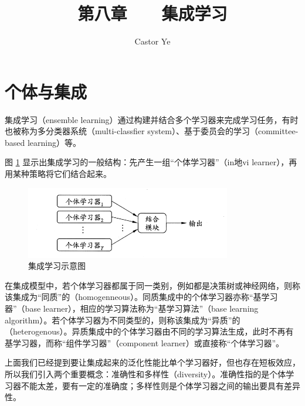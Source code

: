 \documentclass[12pt, a4paper]{article} %
\title{第八章 \ \ \ 集成学习} %
\author{Castor Ye} %
\date{} %
\begin{document}
\maketitle %
\newtheorem{definition}{定义}[section]
\newtheorem{theorem}{定理}[section]
\newtheorem{example}{例}[section]
\newtheorem{solution}{题解}
\newtheorem{algorithm}{算法}
\newtheorem{axiom}{公理}
\newtheorem{property}{性质}
\newtheorem{proposition}{命题}
\newtheorem{lemma}{引理}
\newtheorem{corollary}{推论}[section]
\newtheorem{remark}{注解}
\newtheorem{condition}{条件}
\newtheorem{conclusion}{结论}
\newtheorem{assumption}{假设}
\renewcommand{\figurename}{图} %
\renewcommand{\tablename}{表} %
\section{个体与集成}

集成学习（ensemble learning）通过构建并结合多个学习器来完成学习任务，有时也被称为多分类器系统（multi-classfier system）、基于委员会的学习（committee-based learning）等。

图 \ref{fig:集成学习示意图} 显示出集成学习的一般结构：先产生一组“个体学习器”（in地vi learner），再用某种策略将它们结合起来。

\begin{figure}[H]
    \centering
    \includegraphics[width=0.8\textwidth]{../img/8-1-集成学习示意图.png}
    \caption{集成学习示意图}
    \label{fig:集成学习示意图}
\end{figure}

在集成模型中，若个体学习器都属于同一类别，例如都是决策树或神经网络，则称该集成为“同质”的（homogenneous）。同质集成中的个体学习器亦称“基学习器”（base learner），相应的学习算法称为“基学习算法”（base learning algorithm）。若个体学习器为不同类型的，则称该集成为“异质”的（heterogenous）。异质集成中的个体学习器由不同的学习算法生成，此时不再有基学习器，而称“组件学习器”（component learner）或直接称“个体学习器”。

上面我们已经提到要让集成起来的泛化性能比单个学习器好，但也存在短板效应，所以我们引入两个重要概念：准确性和多样性（diversity）。准确性指的是个体学习器不能太差，要有一定的准确度；多样性则是个体学习器之间的输出要具有差异性。
\end{document}
